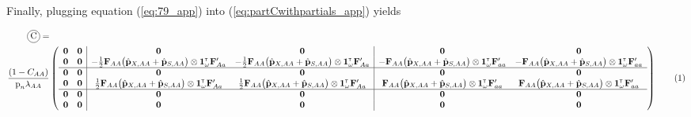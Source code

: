 \documentclass[11pt]{article}
\newcommand\encircle[1]{%
  \tikz[baseline=(X.base)] 
    \node (X) [draw, shape=circle, inner sep=0] {\strut #1};}
\newcommand\numberthis{\addtocounter{equation}{1}\tag{\theequation}}
\def\mbf#1{\mathbf{#1}}
\newcommand{\tr}{{\mbox{\tiny \sf T}}}
\begin{document}
\begin{landscape}
Finally, plugging equation (\ref{eq:79_app}) into (\ref{eq:partCwithpartials_app}) yields

{
\scriptsize
\begin{align*}
	\encircle{C} =& \\
	\frac{(1 - C_{AA})}{\mbox{p}_{n}\lambda_{AA}} &\left(
			\begin{array}{cc|cc|cc}
					\mbf{0} & \mbf{0} & \mbf{0} & \mbf{0} & \mbf{0} & \mbf{0}  \\
				\mbf{0}   &  	\mbf{0}  & -\frac{1}{2} \mbf{F}_{AA} \big(\hat{\mbf{p}}_{X,AA}+ \hat{\mbf{p}}_{S,AA}  \big) \otimes \mathbf{1}^\tr_{\omega} \mathbf{F}_{Aa}^\prime& -\frac{1}{2} \mbf{F}_{AA} \big(\hat{\mbf{p}}_{X,AA}+ \hat{\mbf{p}}_{S,AA}  \big) \otimes \mathbf{1}^\tr_{\omega} \mathbf{F}_{Aa}^\prime & - \mbf{F}_{AA} \big(\hat{\mbf{p}}_{X,AA}+ \hat{\mbf{p}}_{S,AA}  \big) \otimes \mathbf{1}^\tr_{\omega} \mathbf{F}_{aa}^\prime&  - \mbf{F}_{AA} \big(\hat{\mbf{p}}_{X,AA}+ \hat{\mbf{p}}_{S,AA}  \big) \otimes \mathbf{1}^\tr_{\omega} \mathbf{F}_{aa}^\prime \\ \hline
				\mbf{0} & \mbf{0} & \mbf{0} & \mbf{0} & \mbf{0} & \mbf{0} \\
					\mbf{0}   &  	\mbf{0}  & \frac{1}{2} \mbf{F}_{AA} \big(\hat{\mbf{p}}_{X,AA}+ \hat{\mbf{p}}_{S,AA}  \big) \otimes \mathbf{1}^\tr_{\omega} \mathbf{F}_{Aa}^\prime& \frac{1}{2} \mbf{F}_{AA} \big(\hat{\mbf{p}}_{X,AA}+ \hat{\mbf{p}}_{S,AA}  \big) \otimes \mathbf{1}^\tr_{\omega} \mathbf{F}_{Aa}^\prime &  \mbf{F}_{AA} \big(\hat{\mbf{p}}_{X,AA}+ \hat{\mbf{p}}_{S,AA}  \big) \otimes \mathbf{1}^\tr_{\omega} \mathbf{F}_{aa}^\prime&  \mbf{F}_{AA} \big(\hat{\mbf{p}}_{X,AA}+ \hat{\mbf{p}}_{S,AA}  \big) \otimes \mathbf{1}^\tr_{\omega} \mathbf{F}_{aa}^\prime \\  \hline
				\mbf{0} & \mbf{0} & \mbf{0} & \mbf{0} & \mbf{0} & \mbf{0} \\ 
				\mbf{0} & \mbf{0} & \mbf{0} & \mbf{0} & \mbf{0} & \mbf{0} 
			\end{array} \right)  \numberthis			
\end{align*}
}

\end{landscape}
\end{document}
